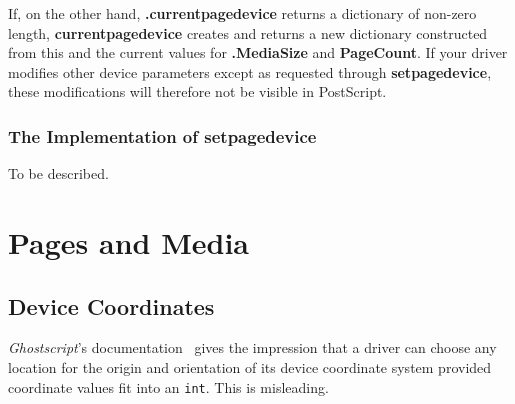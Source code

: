 \documentclass[twoside,a4paper]{article}
\newcommand{\Gs}{\textit{Ghostscript\/}}
\newcommand{\ps}[1]{{\sffamily\bfseries #1}}	%
\newcommand{\prog}[1]{\texttt{#1}}
\newcommand{\file}[1]{\texttt{#1}}	%
\newif\ifdraft \draftfalse
\begin{document}
If, on the other hand, \ps{.currentpagedevice} returns a dictionary of non-zero
length,
\ps{currentpagedevice} creates and returns a new dictionary constructed from
this and the current values for \ps{.MediaSize} and \ps{PageCount}.
If your driver modifies other device parameters except as requested through
\ps{setpagedevice},
these modifications will therefore not be visible in PostScript.

\ifdraft
??? Describe when the data are refreshed.
\fi


\subsubsection{The Implementation of \ps{setpagedevice}}

\ifdraft
\Gs's implementation of \ps{setpagedevice} is fairly complex.
This document lists only some of its properties,
the reader should check the file \file{gs\_setpd.ps} for details.

???
\else
To be described.
\fi


\ifdraft
\subsection{???}

CLI, overriding, multiple access, \prog{Duplex\_set} problem.
\fi


\section{Pages and Media}

\subsection{Device Coordinates}	\label{DevCoord}

\Gs's documentation~\cite[section ``Coordinates and types'']{Drivers5.50}
gives the impression that a driver can choose any location for the origin
and orientation of its device coordinate system provided coordinate values
fit into an \prog{int}.
This is misleading.
\end{document}
